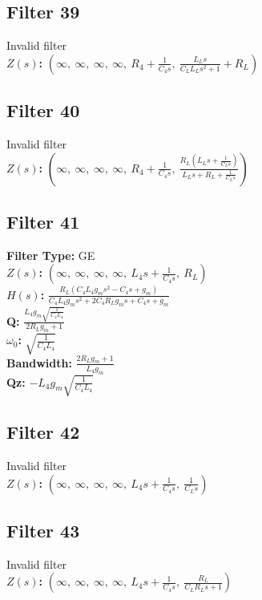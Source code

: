 \documentclass{article}
\begin{document}
\subsection*{Filter 39}
Invalid filter \\ 
\textbf{$Z(s)$:} $\left( \infty, \  \infty, \  \infty, \  \infty, \  R_{4} + \frac{1}{C_{4} s}, \  \frac{L_{L} s}{C_{L} L_{L} s^{2} + 1} + R_{L}\right)$ \\ 
\subsection*{Filter 40}
Invalid filter \\ 
\textbf{$Z(s)$:} $\left( \infty, \  \infty, \  \infty, \  \infty, \  R_{4} + \frac{1}{C_{4} s}, \  \frac{R_{L} \left(L_{L} s + \frac{1}{C_{L} s}\right)}{L_{L} s + R_{L} + \frac{1}{C_{L} s}}\right)$ \\ 
\subsection*{Filter 41}
\textbf{Filter Type:} GE \\ 
\textbf{$Z(s)$:} $\left( \infty, \  \infty, \  \infty, \  \infty, \  L_{4} s + \frac{1}{C_{4} s}, \  R_{L}\right)$ \\ 
\textbf{$H(s)$:} $\frac{R_{L} \left(C_{4} L_{4} g_{m} s^{2} - C_{4} s + g_{m}\right)}{C_{4} L_{4} g_{m} s^{2} + 2 C_{4} R_{L} g_{m} s + C_{4} s + g_{m}}$ \\ 
\textbf{Q:} $\frac{L_{4} g_{m} \sqrt{\frac{1}{C_{4} L_{4}}}}{2 R_{L} g_{m} + 1}$ \\ 
\textbf{$\omega_0$:} $\sqrt{\frac{1}{C_{4} L_{4}}}$ \\ 
\textbf{Bandwidth:} $\frac{2 R_{L} g_{m} + 1}{L_{4} g_{m}}$ \\ 
\textbf{Qz:} $- L_{4} g_{m} \sqrt{\frac{1}{C_{4} L_{4}}}$ \\ 
\subsection*{Filter 42}
Invalid filter \\ 
\textbf{$Z(s)$:} $\left( \infty, \  \infty, \  \infty, \  \infty, \  L_{4} s + \frac{1}{C_{4} s}, \  \frac{1}{C_{L} s}\right)$ \\ 
\subsection*{Filter 43}
Invalid filter \\ 
\textbf{$Z(s)$:} $\left( \infty, \  \infty, \  \infty, \  \infty, \  L_{4} s + \frac{1}{C_{4} s}, \  \frac{R_{L}}{C_{L} R_{L} s + 1}\right)$ \\ 
\end{document}
